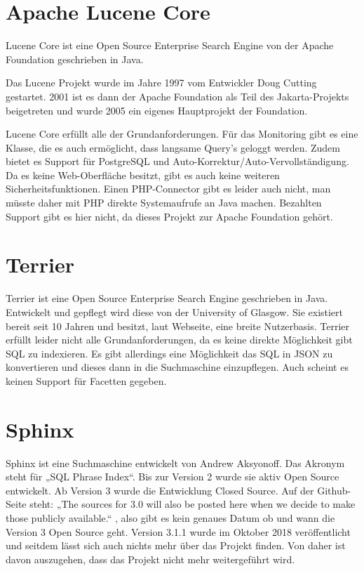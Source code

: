 \section{Apache Lucene Core}
\label{lucenecore}

Lucene Core ist eine Open Source Enterprise Search Engine von der Apache Foundation geschrieben in Java.

Das Lucene Projekt wurde im Jahre 1997 vom Entwickler Doug Cutting gestartet. 2001 ist es dann der Apache Foundation als Teil des Jakarta-Projekts beigetreten und wurde 2005 ein eigenes Hauptprojekt der Foundation. \cite{Wikipedia.2019c}

Lucene Core erfüllt alle der Grundanforderungen. Für das Monitoring gibt es eine Klasse, die es auch ermöglicht, dass langsame Query’s geloggt werden. Zudem bietet es Support für PostgreSQL und Auto-Korrektur/Auto-Vervollständigung. Da es keine Web-Oberfläche besitzt, gibt es auch keine weiteren Sicherheitsfunktionen. Einen PHP-Connector gibt es leider auch nicht, man müsste daher mit PHP direkte Systemaufrufe an Java machen. Bezahlten Support gibt es hier nicht, da dieses Projekt zur Apache Foundation gehört. \cite{TheApacheSoftwareFoundation.2019b}

\section{Terrier}
\label{terrier}

Terrier ist eine Open Source Enterprise Search Engine geschrieben in Java. Entwickelt und gepflegt wird diese von der University of Glasgow. Sie existiert bereit seit 10 Jahren und besitzt, laut Webseite, eine breite Nutzerbasis. 
Terrier erfüllt leider nicht alle Grundanforderungen, da es keine direkte Möglichkeit gibt SQL zu indexieren. Es gibt allerdings eine Möglichkeit das SQL in JSON zu konvertieren und dieses dann in die Suchmaschine einzupflegen. Auch scheint es keinen Support für Facetten gegeben.
\cite{McCreadie.2019}

\section{Sphinx}
\label{sphinx}

Sphinx ist eine Suchmaschine entwickelt von Andrew Aksyonoff. Das Akronym steht für „SQL Phrase Index“.\cite{SphinxTechnologiesInc.b} Bis zur Version 2 wurde sie aktiv Open Source entwickelt. Ab Version 3 wurde die Entwicklung Closed Source. Auf der Github-Seite steht: „The sources for 3.0 will also be posted here when we decide to make those publicly available.“ \cite{sphinxserach.2019}, also gibt es kein genaues Datum ob und wann die Version 3 Open Source geht. Version 3.1.1 wurde im Oktober 2018 veröffentlicht und seitdem lässt sich auch nichts mehr über das Projekt finden. Von daher ist davon auszugehen, dass das Projekt nicht mehr weitergeführt wird. 

